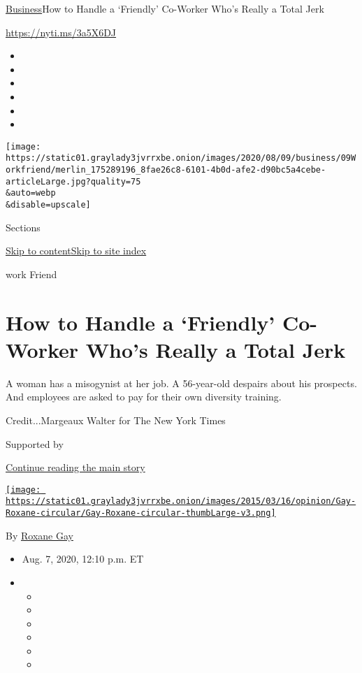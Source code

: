 \href{/section/business}{Business}\textbar{}How to Handle a `Friendly'
Co-Worker Who's Really a Total Jerk

\url{https://nyti.ms/3a5X6DJ}

\begin{itemize}
\item
\item
\item
\item
\item
\item
\end{itemize}

\texttt{[image: https://static01.graylady3jvrrxbe.onion/images/2020/08/09/business/09Workfriend/merlin\_175289196\_8fae26c8-6101-4b0d-afe2-d90bc5a4cebe-articleLarge.jpg?quality=75\\\&auto=webp\\\&disable=upscale]}

Sections

\protect\hyperlink{site-content}{Skip to
content}\protect\hyperlink{site-index}{Skip to site index}

work Friend

\hypertarget{how-to-handle-a-friendly-co-worker-whos-really-a-total-jerk}{%
\section{How to Handle a `Friendly' Co-Worker Who's Really a Total
Jerk}\label{how-to-handle-a-friendly-co-worker-whos-really-a-total-jerk}}

A woman has a misogynist at her job. A 56-year-old despairs about his
prospects. And employees are asked to pay for their own diversity
training.

Credit...Margeaux Walter for The New York Times

Supported by

\protect\hyperlink{after-sponsor}{Continue reading the main story}

\href{https://www.nytimes3xbfgragh.onion/column/roxane-gay}{\texttt{[image: https://static01.graylady3jvrrxbe.onion/images/2015/03/16/opinion/Gay-Roxane-circular/Gay-Roxane-circular-thumbLarge-v3.png]}}

By \href{https://www.nytimes3xbfgragh.onion/column/roxane-gay}{Roxane
Gay}

\begin{itemize}
\item
  Aug. 7, 2020, 12:10 p.m. ET
\item
  \begin{itemize}
  \item
  \item
  \item
  \item
  \item
  \item
  \end{itemize}
\end{itemize}

